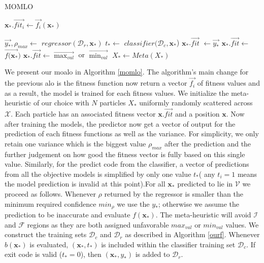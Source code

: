 \documentclass[12pt, runningheads,a4paper]{llncs}
\begin{document}
\begin{algorithm}
\footnotesize

\caption{MOMLO}\label{momlo}
\begin{algorithmic}[1]
		\State $\mathbf{x_*}.\overrightarrow{fit_i} \gets \overrightarrow{f_i}(\mathbf{x_*})$ 
	\EndFor
\EndFor
\Repeat   
  
      \State $\overrightarrow{y_*},\rho_{max}  \gets$ $regressor(\mathcal{D}_{r},\mathbf{x_*})$
      \State $t_* \gets $ $classifier(\mathcal{D}_{c},\mathbf{x_*}$)
        	\State $\mathbf{x_*}$.$\overrightarrow{fit}$ $\gets \overrightarrow{y_*}$
      		\Else
         		 \State $\mathbf{x_*}.\overrightarrow{fit} \gets$ $\overrightarrow{f(\mathbf{x_*}})$
	        \Else 
    		     \State $\mathbf{x_*}.\overrightarrow{fit} \gets \vec{\max_{val}}$ or $\vec{\min_{val}}$
	        \EndIf
    	\EndIf
    \EndFor
	\State $X_* \gets Meta(X_*)$ 

\end{algorithmic}
\end{algorithm}

We present our \ac{moalo} in Algorithm \ref{momlo}. The algorithm's main change for the previous \ac{alo} \cite{arc2012MLO} is the fitness function now return a vector $\overrightarrow{f_i}$ of fitness values and as a result, the model is trained for each fitness values.  We initialize the meta-heuristic of our choice with $N$ particles $X_*$ uniformly randomly scattered across $\mathcal{X}$. Each particle has an associated fitness vector $\mathbf{x}.\overrightarrow{fit}$ and a position $\mathbf{x}$. Now after training the models, the predictor now get a vector of output for the prediction of each fitness functions as well as the variance. For simplicity, we only retain one variance which is the biggest value $\rho_{max}$ after the prediction and the further judgement on how good the fitness vector is fully based on this single value. Similarly, for the predict code from the classifier, a vector of predictions from all the objective models is simplified by only one value $t_*$( any $t_i = 1$ means the model prediction is invalid at this point).For all $\mathbf{x_*}$ predicted to lie in $\mathcal{V}$ we proceed as follows. Whenever $\rho$ returned by the regressor is smaller than the minimum required confidence $min_{\rho}$ we use the $y_*$; otherwise we assume the prediction to be inaccurate and evaluate $f(\mathbf{x_*})$. The meta-heuristic will avoid $\mathcal{I}$ and $\mathcal{F}$ regions as they are both assigned unfavorable $max_{val}$ or $min_{val}$ values. We construct the training sets $\mathcal{D}_{c}$ and $\mathcal{D}_{r}$ as described in Algorithm \ref{ourf}. Whenever $b(\mathbf{x_*})$ is evaluated,  $(\mathbf{x_*},t_*)$ is included within the classifier training set $\mathcal{D}_{c}$. If exit code is valid ($t_*=0$), then $(\mathbf{x_*},y_*)$ is added to $\mathcal{D}_{r}$. 
\end{document}
